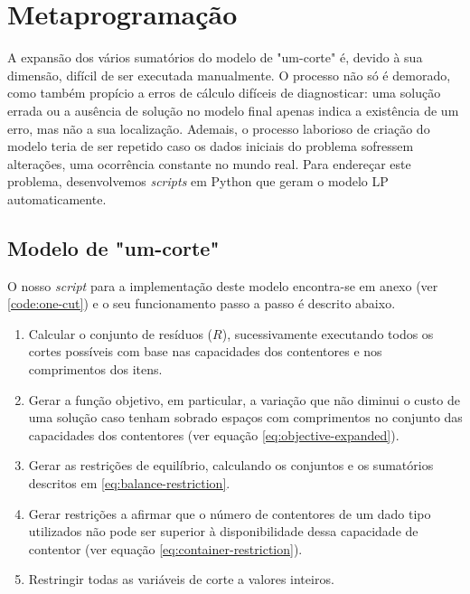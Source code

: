\documentclass[12pt, a4paper, titlepage]{article}
\begin{document}
\section{Metaprogramação}

A expansão dos vários sumatórios do modelo de "um-corte"{} é, devido à sua dimensão, difícil de ser
executada manualmente. O processo não só é demorado, como também propício a erros de cálculo
difíceis de diagnosticar: uma solução errada ou a ausência de solução no modelo final apenas indica
a existência de um erro, mas não a sua localização. Ademais, o processo laborioso de criação do
modelo teria de ser repetido caso os dados iniciais do problema sofressem alterações, uma ocorrência
constante no mundo real. Para endereçar este problema, desenvolvemos \emph{scripts} em Python que
geram o modelo LP automaticamente.

\subsection{Modelo de "um-corte"{}}

O nosso \emph{script} para a implementação deste modelo encontra-se em anexo (ver
\ref{code:one-cut}) e o seu funcionamento passo a passo é descrito abaixo.

\begin{enumerate}
    \item Calcular o conjunto de resíduos ($R$), sucessivamente executando todos os cortes possíveis
        com base nas capacidades dos contentores e nos comprimentos dos itens.

    \item Gerar a função objetivo, em particular, a variação que não diminui o custo de uma solução
        caso tenham sobrado espaços com comprimentos no conjunto das capacidades dos contentores
        (ver equação \ref{eq:objective-expanded}).

    \item Gerar as restrições de equilíbrio, calculando os conjuntos e os sumatórios descritos em
        \eqref{eq:balance-restriction}.

    \item Gerar restrições a afirmar que o número de contentores de um dado tipo utilizados não pode
        ser superior à disponibilidade dessa capacidade de contentor (ver equação
        \ref{eq:container-restriction}).

    \item Restringir todas as variáveis de corte a valores inteiros.
\end{enumerate}
\end{document}
